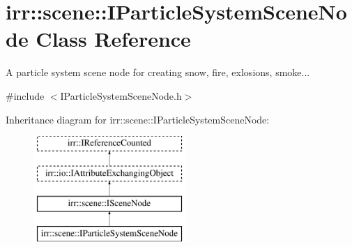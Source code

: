 \hypertarget{classirr_1_1scene_1_1IParticleSystemSceneNode}{}\section{irr\+:\+:scene\+:\+:I\+Particle\+System\+Scene\+Node Class Reference}
\label{classirr_1_1scene_1_1IParticleSystemSceneNode}


A particle system scene node for creating snow, fire, exlosions, smoke...  




{\ttfamily \#include $<$I\+Particle\+System\+Scene\+Node.\+h$>$}

Inheritance diagram for irr\+:\+:scene\+:\+:I\+Particle\+System\+Scene\+Node\+:\begin{figure}[H]
\begin{center}
\leavevmode
\includegraphics[height=4.000000cm]{classirr_1_1scene_1_1IParticleSystemSceneNode}
\end{center}
\end{figure}
